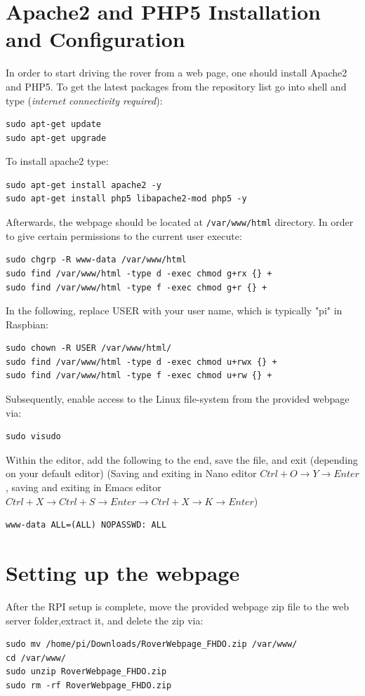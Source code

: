 \section{Apache2 and PHP5 Installation and Configuration}
	In order to start driving the rover from a web page, one should install Apache2 and PHP5. To get the latest packages from the repository list go into shell and type (\textit{internet connectivity required}):
\begin{lstlisting}
sudo apt-get update
sudo apt-get upgrade
\end{lstlisting}
To install apache2 type:
\begin{lstlisting}
sudo apt-get install apache2 -y
sudo apt-get install php5 libapache2-mod php5 -y
\end{lstlisting}
Afterwards, the webpage should be located at \texttt{/var/www/html} directory. In order to give certain permissions to the current user execute: 
\begin{lstlisting}
sudo chgrp -R www-data /var/www/html
sudo find /var/www/html -type d -exec chmod g+rx {} +
sudo find /var/www/html -type f -exec chmod g+r {} +
\end{lstlisting}
In the following, replace USER with your user name, which is typically "pi" in Raspbian:

\begin{lstlisting}
sudo chown -R USER /var/www/html/
sudo find /var/www/html -type d -exec chmod u+rwx {} +
sudo find /var/www/html -type f -exec chmod u+rw {} +
\end{lstlisting}
Subsequently, enable access to the Linux file-system from the provided webpage via:
\begin{lstlisting}
sudo visudo
\end{lstlisting}
Within the editor, add the following to the end, save the file, and exit (depending on your default editor)
(Saving and exiting in Nano editor $Ctrl+O \rightarrow Y \rightarrow Enter$, saving and exiting in Emacs editor $Ctrl + X \rightarrow Ctrl + S \rightarrow Enter \rightarrow Ctrl + X \rightarrow K \rightarrow Enter$) 
\begin{lstlisting}
www-data ALL=(ALL) NOPASSWD: ALL
\end{lstlisting}
\section{Setting up the webpage}
After the RPI setup is complete, move the provided webpage zip file to the web server folder,extract it, and delete the zip via:
\begin{lstlisting}
sudo mv /home/pi/Downloads/RoverWebpage_FHDO.zip /var/www/
cd /var/www/ 
sudo unzip RoverWebpage_FHDO.zip
sudo rm -rf RoverWebpage_FHDO.zip
\end{lstlisting}
